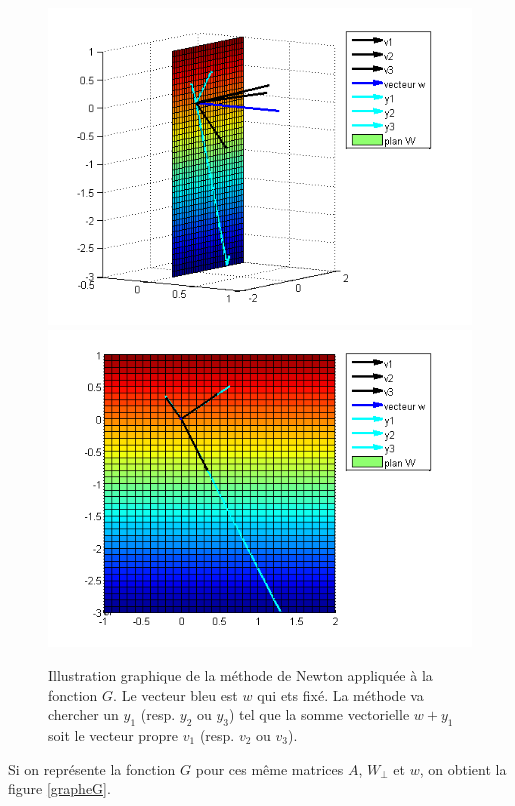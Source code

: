 \begin{figure}
\centering
\includegraphics[width=12cm]{grapheNewton.png}\\
\includegraphics[width=12cm]{grapheNewton2.png}
\caption{Illustration graphique de la méthode de Newton appliquée à la fonction $G$. Le vecteur bleu est $w$ qui ets fixé. La méthode va chercher un $y_1$ (resp. $y_2$ ou $y_3$) tel que la somme vectorielle $w+y_1$ soit le vecteur propre $v_1$ (resp. $v_2$ ou $v_3$).}
\label{figureNewton}
\end{figure}

Si on représente la fonction $G$ pour ces même matrices $A$, $W_{\bot}$ et $w$, on obtient la figure \ref{grapheG}.


